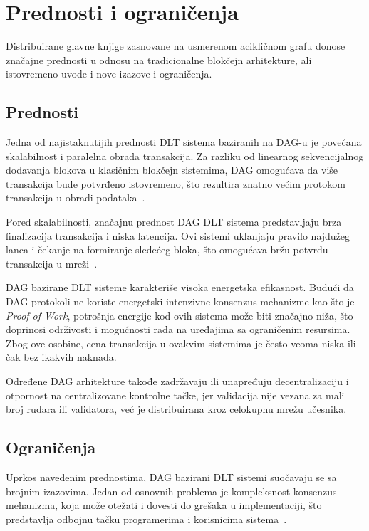 \section{Prednosti i ograničenja}

Distribuirane glavne knjige zasnovane na usmerenom acikličnom grafu donose značajne prednosti u odnosu na tradicionalne blokčejn arhitekture, ali istovremeno uvode i nove izazove i ograničenja.

\subsection{Prednosti}

Jedna od najistaknutijih prednosti DLT sistema baziranih na DAG-u je povećana skalabilnost i paralelna obrada transakcija. Za razliku od linearnog sekvencijalnog dodavanja blokova u klasičnim blokčejn sistemima, DAG omogućava da više transakcija bude potvrđeno istovremeno, što rezultira znatno većim protokom transakcija u obradi podataka~\cite{DAG in Smart Mobility}. %

Pored skalabilnosti, značajnu prednost DAG DLT sistema predstavljaju brza finalizacija transakcija i niska latencija. Ovi sistemi uklanjaju pravilo najdužeg lanca i čekanje na formiranje sledećeg bloka, što omogućava bržu potvrdu transakcija u mreži~\cite{blockeden DAG}.

DAG bazirane DLT sisteme karakteriše visoka energetska efikasnost. Budući da DAG protokoli ne koriste energetski intenzivne konsenzus mehanizme kao što je \textit{Proof-of-Work}, potrošnja energije kod ovih sistema može biti značajno niža, što doprinosi održivosti i mogućnosti rada na uređajima sa ograničenim resursima. Zbog ove osobine, cena transakcija u ovakvim sistemima je često veoma niska ili čak bez ikakvih naknada.~\cite{DAG in Smart Mobility}

Određene DAG arhitekture takođe zadržavaju ili unapređuju decentralizaciju i otpornost na centralizovane kontrolne tačke, jer validacija nije vezana za mali broj rudara ili validatora, već je distribuirana kroz celokupnu mrežu učesnika.

\subsection{Ograničenja}

Uprkos navedenim prednostima, DAG bazirani DLT sistemi suočavaju se sa brojnim izazovima. Jedan od osnovnih problema je kompleksnost konsenzus mehanizma, koja može otežati i dovesti do grešaka u implementaciji, što predstavlja odbojnu tačku programerima i korisnicima sistema~\cite{DAG in Smart Mobility}.


